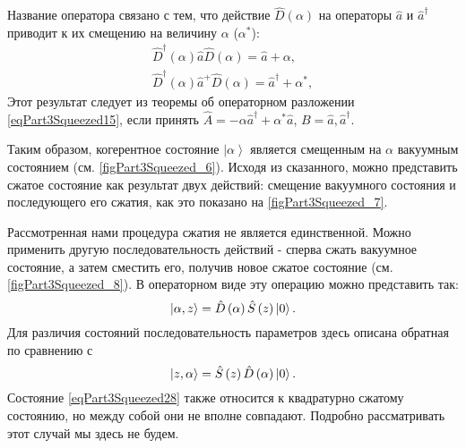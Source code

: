 Название оператора связано с тем, что действие
$\hat{D}\left(\alpha\right)$ на операторы $\hat{a}$ и $\hat{a}^{\dag}$
приводит к их смещению на величину $\alpha$ ($\alpha^{*}$):
\begin{eqnarray}
\hat{D}^{\dag}\left(\alpha\right)\hat{a}\hat{D}\left(\alpha\right) =
\hat{a} + \alpha,
\nonumber \\
\hat{D}^{\dag}\left(\alpha\right)\hat{a}^{+}\hat{D}\left(\alpha\right) =
\hat{a}^{\dag} + \alpha^{*},
\label{eqPart3SqueezedTaskOffset}
\end{eqnarray}
Этот результат следует из теоремы об операторном разложении
\eqref{eqPart3Squeezed15}, если принять $\hat{A} = - \alpha \hat{a}^{\dag}
+ \alpha^{*} \hat{a}$, $B=\hat{a}, \hat{a}^{\dag}$.



Таким образом, когерентное состояние $\left|\alpha\right>$ является
смещенным на $\alpha$ вакуумным состоянием
(см. \autoref{figPart3Squeezed_6}).
Исходя из сказанного, можно представить сжатое
состояние как результат двух действий: смещение вакуумного состояния и
последующего его сжатия, как это показано на
\autoref{figPart3Squeezed_7}. 




Рассмотренная нами процедура сжатия не является единственной. Можно
применить другую последовательность действий - сперва сжать вакуумное
состояние, а затем сместить его, получив новое сжатое состояние
(см. \autoref{figPart3Squeezed_8}). В операторном виде эту операцию
можно представить так:
\begin{equation}
\left|\alpha, z\right> =
\hat{D}\left(\alpha\right)\hat{S}\left(z\right) \ket{0}.
\label{eqPart3Squeezed28}
\end{equation}
Для различия состояний последовательность параметров здесь описана
обратная по сравнению с 
\[
\left|z,\alpha\right> =
\hat{S}\left(z\right) \hat{D}\left(\alpha\right)\ket{0}.
\]
Состояние \eqref{eqPart3Squeezed28} также относится к квадратурно
сжатому состоянию, но между собой они не вполне совпадают. Подробно
рассматривать этот случай мы здесь не будем.



